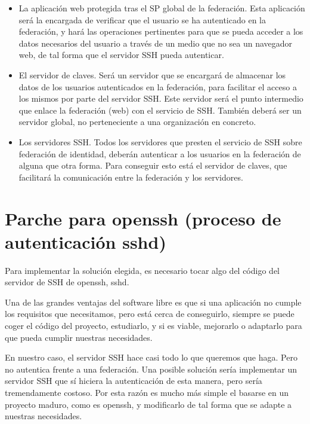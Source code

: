     \begin{itemize}
        
        \item La aplicación web protegida tras el SP global de la
        federación. Esta aplicación será la encargada de verificar que el
        usuario se ha autenticado en la federación, y hará las operaciones
        pertinentes para que se pueda acceder a los datos necesarios del
        usuario a través de un medio que no sea un navegador web, de tal
        forma que el servidor SSH pueda autenticar.

        \item El servidor de claves. Será un servidor que se encargará de
        almacenar los datos de los usuarios autenticados en la federación,
        para facilitar el acceso a los mismos por parte del servidor SSH.
        Este servidor será el punto intermedio que enlace la federación
        (web) con el servicio de SSH. También deberá ser un servidor
        global, no perteneciente a una organización en concreto.

        \item Los servidores SSH. Todos los servidores que presten el
        servicio de SSH sobre federación de identidad, deberán autenticar a
        los usuarios en la federación de alguna que otra forma. Para
        conseguir esto está el servidor de claves, que facilitará la
        comunicación entre la federación y los servidores.

    \end{itemize}

    \section{Parche para openssh (proceso de autenticación sshd)}
    \label{openssh}

    Para implementar la solución elegida, es necesario tocar algo del
    código del servidor de SSH de openssh, sshd.

    Una de las grandes ventajas del software libre es que si una aplicación
    no cumple los requisitos que necesitamos, pero está cerca de
    conseguirlo, siempre se puede coger el código del proyecto, estudiarlo,
    y si es viable, mejorarlo o adaptarlo para que pueda cumplir nuestras
    necesidades.

    En nuestro caso, el servidor SSH hace casi todo lo que queremos que
    haga. Pero no autentica frente a una federación. Una posible solución
    sería implementar un servidor SSH que sí hiciera la autenticación de
    esta manera, pero sería tremendamente costoso. Por esta razón es mucho
    más simple el basarse en un proyecto maduro, como es openssh, y
    modificarlo de tal forma que se adapte a nuestras necesidades.

